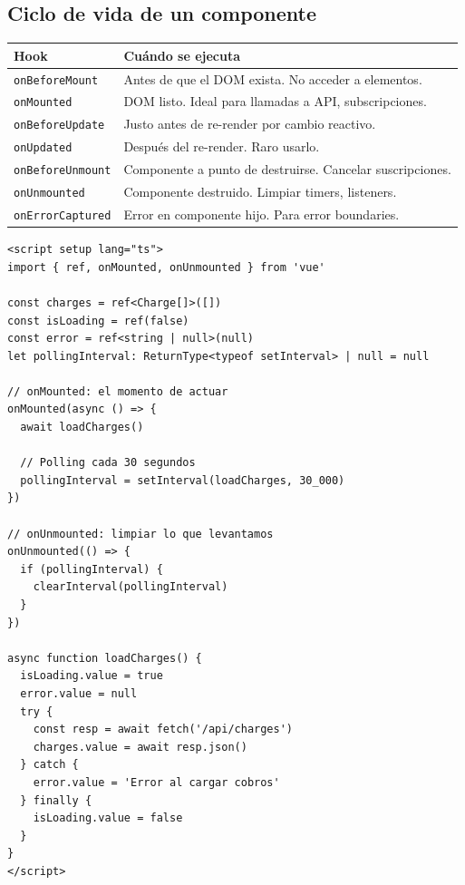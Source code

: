 \documentclass[11pt,a4paper]{article}
\begin{document}
\subsection{Ciclo de vida de un componente}

\begin{center}
\begin{tabular}{p{3.5cm} p{9cm}}
\toprule
\textbf{Hook} & \textbf{Cuándo se ejecuta} \\
\midrule
\texttt{onBeforeMount} & Antes de que el DOM exista. No acceder a elementos. \\
\texttt{onMounted}     & DOM listo. Ideal para llamadas a API, subscripciones. \\
\texttt{onBeforeUpdate}& Justo antes de re-render por cambio reactivo. \\
\texttt{onUpdated}     & Después del re-render. Raro usarlo. \\
\texttt{onBeforeUnmount}& Componente a punto de destruirse. Cancelar suscripciones. \\
\texttt{onUnmounted}   & Componente destruido. Limpiar timers, listeners. \\
\texttt{onErrorCaptured}& Error en componente hijo. Para error boundaries. \\
\bottomrule
\end{tabular}
\end{center}

\begin{pergamino}
\begin{lstlisting}[style=vue]
<script setup lang="ts">
import { ref, onMounted, onUnmounted } from 'vue'

const charges = ref<Charge[]>([])
const isLoading = ref(false)
const error = ref<string | null>(null)
let pollingInterval: ReturnType<typeof setInterval> | null = null

// onMounted: el momento de actuar
onMounted(async () => {
  await loadCharges()

  // Polling cada 30 segundos
  pollingInterval = setInterval(loadCharges, 30_000)
})

// onUnmounted: limpiar lo que levantamos
onUnmounted(() => {
  if (pollingInterval) {
    clearInterval(pollingInterval)
  }
})

async function loadCharges() {
  isLoading.value = true
  error.value = null
  try {
    const resp = await fetch('/api/charges')
    charges.value = await resp.json()
  } catch {
    error.value = 'Error al cargar cobros'
  } finally {
    isLoading.value = false
  }
}
</script>
\end{lstlisting}
\end{pergamino}
\end{document}

